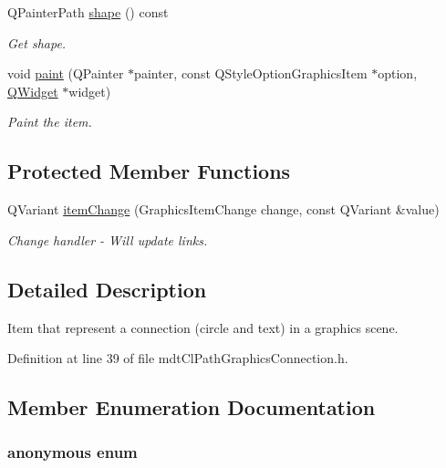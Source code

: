 \begin{DoxyCompactItemize}
Q\-Painter\-Path \hyperlink{classmdt_cl_path_graphics_connection_ab8cdca8e618caa986197c46d104b2eb5}{shape} () const 
\begin{DoxyCompactList}\small\item\em Get shape. \end{DoxyCompactList}\item 
void \hyperlink{classmdt_cl_path_graphics_connection_ae5ae525a6a7cfbc8be1b61ed0b355bc9}{paint} (Q\-Painter $\ast$painter, const Q\-Style\-Option\-Graphics\-Item $\ast$option, \hyperlink{class_q_widget}{Q\-Widget} $\ast$widget)
\begin{DoxyCompactList}\small\item\em Paint the item. \end{DoxyCompactList}\end{DoxyCompactItemize}
\subsection*{Protected Member Functions}
\begin{DoxyCompactItemize}
\item 
Q\-Variant \hyperlink{classmdt_cl_path_graphics_connection_a59dd72cba30a0ea3053df96198113886}{item\-Change} (Graphics\-Item\-Change change, const Q\-Variant \&value)
\begin{DoxyCompactList}\small\item\em Change handler -\/ Will update links. \end{DoxyCompactList}\end{DoxyCompactItemize}


\subsection{Detailed Description}
Item that represent a connection (circle and text) in a graphics scene. 

Definition at line 39 of file mdt\-Cl\-Path\-Graphics\-Connection.\-h.



\subsection{Member Enumeration Documentation}
\hypertarget{classmdt_cl_path_graphics_connection_a44e9a0adc0eeb58723d564c163accd2f}{\subsubsection[{anonymous enum}]{\setlength{\rightskip}{0pt plus 5cm}anonymous enum}}\label{classmdt_cl_path_graphics_connection_a44e9a0adc0eeb58723d564c163accd2f}


